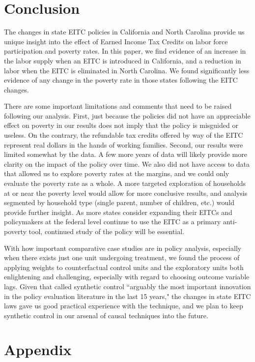 \documentclass{article}
\newcommand*\InputTable[1]{}
\begin{document}
\section{Conclusion}

The changes in state EITC policies in California and North Carolina provide us unique insight into the effect of Earned Income Tax Credits on labor force participation and poverty rates. In this paper, we find evidence of an increase in the labor supply when an EITC is introduced in California, and a reduction in labor when the EITC is eliminated in North Carolina. We found significantly less evidence of any change in the poverty rate in those states following the EITC changes. 

There are some important limitations and comments that need to be raised following our analysis. First, just because the policies did not have an appreciable effect on poverty in our results does not imply that the policy is misguided or useless. On the contrary, the refundable tax credits offered by way of the EITC represent real dollars in the hands of working families. Second, our results were limited somewhat by the data. A few more years of data will likely provide more clarity on the impact of the policy over time. We also did not have access to data that allowed us to explore poverty rates at the margins, and we could only evaluate the poverty rate as a whole. A more targeted exploration of households at or near the poverty level would allow for more conclusive results, and analysis segmented by household type (single parent, number of children, etc.) would provide further insight. As more states consider expanding their EITCs and policymakers at the federal level continue to use the EITC as a primary anti-poverty tool, continued study of the policy will be essential. 

With how important comparative case studies are in policy analysis, especially when there exists just one unit undergoing treatment, we found the process of applying weights to counterfactual control units and the exploratory units both enlightening and challenging, especially with regard to choosing outcome variable lags. Given that \cite{athey2017state} called synthetic control ``arguably the most important innovation in the policy evaluation literature in the last 15 years," the changes in state EITC laws gave us good practical experience with the technique, and we plan to keep synthetic control in our arsenal of causal techniques into the future.  

{}


\newpage
\section*{Appendix}

\InputTable{summarystats}
\InputTable{ca_lab}
\InputTable{ca_pov}
\InputTable{nc_lab}
\InputTable{nc_pov}
\end{document}

